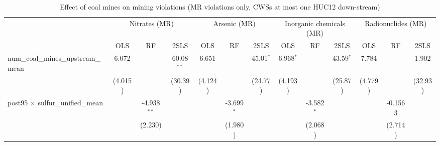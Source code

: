 
\begin{table}[htbp]
   
   \caption{\label{2sls_dwnstrm_minevio_mr} Effect of coal mines on mining violations (MR violations only, CWSs at most one HUC12 down-stream)}
   \bigskip
   
   \centering
   
   \begin{adjustbox}{width = \textwidth, center}
      
      
      \begin{tabular}{lcccccccccccc}
         \toprule
         
          & \multicolumn{3}{c}{Nitrates (MR)} & \multicolumn{3}{c}{Arsenic (MR)} & \multicolumn{3}{c}{Inorganic chemicals (MR)} & \multicolumn{3}{c}{Radionuclides (MR)}\\
         
                                                                             & OLS           & RF            & 2SLS          & OLS           & RF            & 2SLS          & OLS           & RF            & 2SLS          & OLS           & RF                    & 2SLS\\  
         
         \midrule 
         num\_coal\_mines\_upstream\_mean                                    & 6.072         &               & 60.08$^{**}$  & 6.651         &               & 45.01$^{*}$   & 6.968$^{*}$   &               & 43.59$^{*}$   & 7.784         &                       & 1.902\\   
                                                                             & (4.015)       &               & (30.39)       & (4.124)       &               & (24.77)       & (4.193)       &               & (25.87)       & (4.779)       &                       & (32.93)\\   
         post95 $\times$ sulfur\_unified\_mean                               &               & -4.938$^{**}$ &               &               & -3.699$^{*}$  &               &               & -3.582$^{*}$  &               &               & -0.1563               &   \\   
                                                                             &               & (2.230)       &               &               & (1.980)       &               &               & (2.068)       &               &               & (2.714)               &   \\   
         

\end{tabular}
\end{adjustbox}
\end{table}
